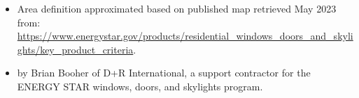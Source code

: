 \begin{itemize}
\item Area definition approximated based on published map retrieved May 2023 from: \href{https://www.energystar.gov/products/residential_windows_doors_and_skylights/key_product_criteria}{https://www.energystar.gov/products/residential\_windows\_doors\_and\_skylights/key\_product\_criteria}.
\item by Brian Booher of D+R International, a support contractor for the ENERGY STAR windows, doors, and skylights program.
\end{itemize}
